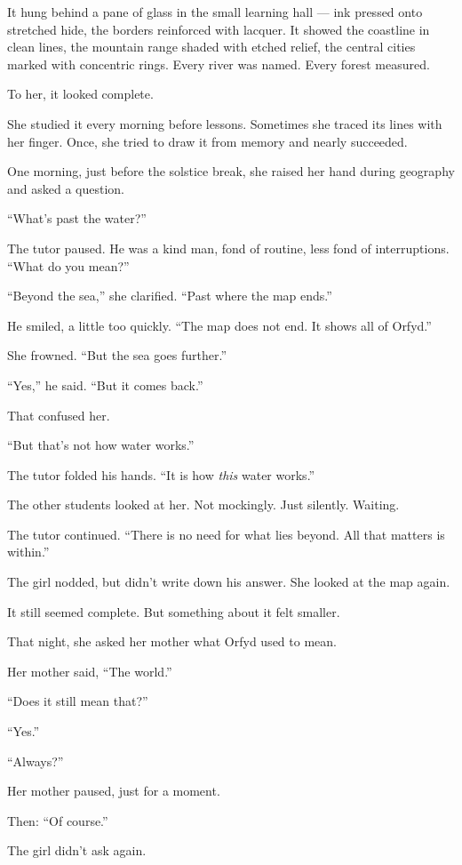 \documentclass[12pt]{article}
\begin{document}
It hung behind a pane of glass in the small learning hall — ink pressed onto stretched hide, the borders reinforced with lacquer. It showed the coastline in clean lines, the mountain range shaded with etched relief, the central cities marked with concentric rings. Every river was named. Every forest measured.

To her, it looked complete.

She studied it every morning before lessons. Sometimes she traced its lines with her finger. Once, she tried to draw it from memory and nearly succeeded.

One morning, just before the solstice break, she raised her hand during geography and asked a question.

``What’s past the water?''

The tutor paused. He was a kind man, fond of routine, less fond of interruptions. ``What do you mean?''

``Beyond the sea,'' she clarified. ``Past where the map ends.''

He smiled, a little too quickly. ``The map does not end. It shows all of Orfyd.''

She frowned. ``But the sea goes further.''

``Yes,'' he said. ``But it comes back.''

That confused her.

``But that’s not how water works.''

The tutor folded his hands. ``It is how \emph{this} water works.''

The other students looked at her. Not mockingly. Just silently. Waiting.

The tutor continued. ``There is no need for what lies beyond. All that matters is within.''

The girl nodded, but didn’t write down his answer. She looked at the map again.

It still seemed complete. But something about it felt smaller.

That night, she asked her mother what Orfyd used to mean.

Her mother said, ``The world.''

``Does it still mean that?''

``Yes.''

``Always?''

Her mother paused, just for a moment.

Then: ``Of course.''

The girl didn’t ask again.
\end{document}
